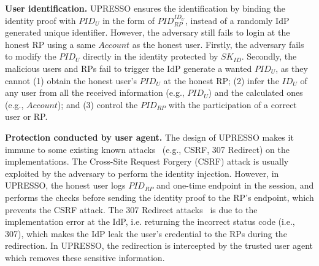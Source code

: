 \vspace{1mm}\noindent\textbf{User identification.} UPRESSO ensures the identification by binding the identity proof with $PID_U$  in the form of $PID_{RP}^{ID_U}$, instead of a randomly IdP generated unique identifier. However, the adversary still fails to login at the honest RP using a same $Account$ as the honest user. Firstly, the adversary fails to  modify the $PID_U$ directly in the identity protected by $SK_{ID}$. Secondly, the malicious users and RPs fail to trigger the IdP generate a wanted $PID_U$, as they cannot (1) obtain the honest user's $PID_U$ at the honest RP; (2) infer the $ID_U$ of any user from all the received  information (e.g., $PID_U$) and the calculated ones (e.g., $Account$); and (3) control the $PID_{RP}$ with the participation of a correct user or RP.

\vspace{1mm}\noindent\textbf{Protection conducted by user agent.} The design of UPRESSO makes it immune to some existing known attacks~\cite{FettKS16} (e.g., CSRF, 307 Redirect) on the implementations. The Cross-Site Request Forgery (CSRF) attack is  usually exploited by the adversary to perform the identity injection. However, in UPRESSO, the honest user logs  $PID_{RP}$ and one-time endpoint in the session,  and performs the checks before sending the identity proof to the RP's endpoint, which prevents the CSRF attack. The 307 Redirect attacks~\cite{FettKS16} is due to the implementation error at the IdP, i.e. returning the incorrect status code (i.e., 307), which makes the IdP leak the user's credential to the RPs during the redirection. In UPRESSO, the redirection is intercepted by the trusted user agent which removes these sensitive information. 

